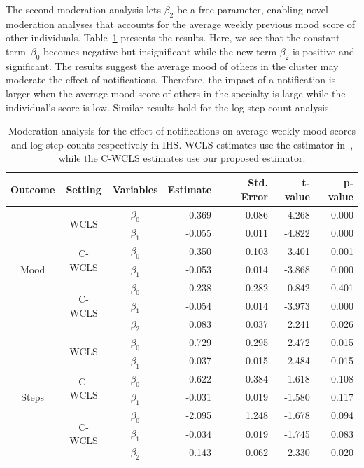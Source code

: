 \documentclass[12pt]{article}
\newcommand{\zw}[1]{\textcolor{blue}{[\textit{ZW: #1}]}}
\begin{document}
The second moderation analysis lets $\beta_2$ be a free parameter, enabling novel moderation analyses that accounts for the average weekly previous mood score of other individuals.  Table~\ref{tab:IHS_direct} presents the results.  Here, we see that the constant term~$\beta_0$ becomes negative but insignificant while the new term $\beta_2$ is positive and significant.  The results suggest the average mood of others in the cluster may moderate the effect of notifications.  Therefore, the impact of a notification is larger when the average mood score of others in the specialty is large while the individual's score is low.   Similar results hold for the log step-count analysis.

\begin{table}[!th]
\centering
\begin{tabular}{c |c | crrrr}
\hline
Outcome & Setting & Variables & Estimate & Std. Error & t-value & p-value \\ \hline
\multirow{7}{*}{Mood} & \multirow{2}{*}{WCLS} & $\beta_0$ & 0.369 & 0.086 & 4.268 & 0.000 \\
& & $\beta_1$ & -0.055 & 0.011 & -4.822 & 0.000 \\ \cline{2-7}
& \multirow{2}{*}{C-WCLS} & $\beta_0$ & 0.350 & 0.103 & 3.401 & 0.001 \\
& & $\beta_1$ & -0.053 & 0.014 & -3.868 & 0.000 \\ \cline{2-7}
& \multirow{3}{*}{C-WCLS} & $\beta_0$ & -0.238 & 0.282 & -0.842 & 0.401 \\
& & $\beta_1$ & -0.054 & 0.014 & -3.973 & 0.000 \\
& & $\beta_2$ & 0.083 & 0.037 & 2.241 & 0.026 \\ \hline
\multirow{7}{*}{Steps} & \multirow{2}{*}{WCLS} & $\beta_0$ & 0.729 & 0.295 & 2.472 & 0.015 \\
& & $\beta_1$ & -0.037 & 0.015 & -2.484 & 0.015 \\ \cline{2-7}
& \multirow{2}{*}{C-WCLS} & $\beta_0$ & 0.622 & 0.384 & 1.618 & 0.108 \\
& & $\beta_1$ & -0.031 & 0.019 & -1.580 & 0.117 \\ \cline{2-7}
& \multirow{3}{*}{C-WCLS} & $\beta_0$ & -2.095 & 1.248 & -1.678 & 0.094 \\
& & $\beta_1$ & -0.034 & 0.019 & -1.745 & 0.083 \\
& & $\beta_2$ & 0.143 & 0.062 &2.330 & 0.020 \\ \hline
\end{tabular}
\caption{Moderation analysis for the effect of notifications on average weekly mood scores and log step counts respectively in IHS. WCLS estimates use the estimator in~\cite{Boruvkaetal}, while the C-WCLS estimates use our proposed estimator.}
\label{tab:IHS_direct}
\end{table}
\end{document}
